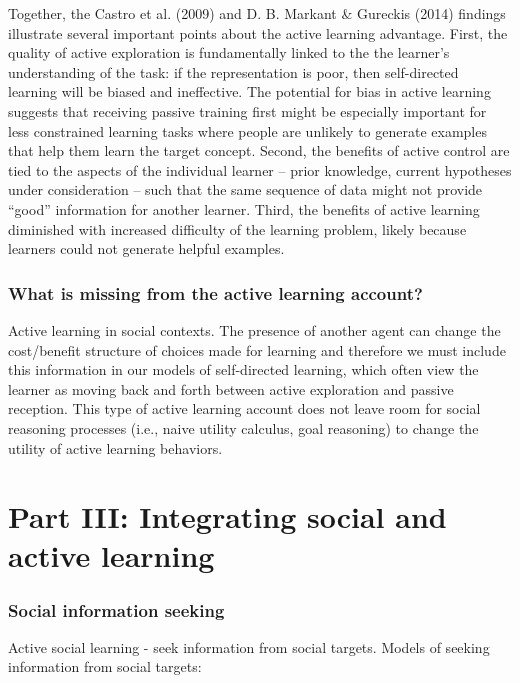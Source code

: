 \documentclass[a4paper,man,apacite,floatsintext]{apa6}
\begin{document}
Together, the Castro et al. (2009) and D. B. Markant \& Gureckis (2014)
findings illustrate several important points about the active learning
advantage. First, the quality of active exploration is fundamentally
linked to the the learner's understanding of the task: if the
representation is poor, then self-directed learning will be biased and
ineffective. The potential for bias in active learning suggests that
receiving passive training first might be especially important for less
constrained learning tasks where people are unlikely to generate
examples that help them learn the target concept. Second, the benefits
of active control are tied to the aspects of the individual learner --
prior knowledge, current hypotheses under consideration -- such that the
same sequence of data might not provide ``good'' information for another
learner. Third, the benefits of active learning diminished with
increased difficulty of the learning problem, likely because learners
could not generate helpful examples.

\subsubsection{What is missing from the active learning
account?}\label{what-is-missing-from-the-active-learning-account}

Active learning in social contexts. The presence of another agent can
change the cost/benefit structure of choices made for learning and
therefore we must include this information in our models of
self-directed learning, which often view the learner as moving back and
forth between active exploration and passive reception. This type of
active learning account does not leave room for social reasoning
processes (i.e., naive utility calculus, goal reasoning) to change the
utility of active learning behaviors.

\section{Part III: Integrating social and active
learning}\label{part-iii-integrating-social-and-active-learning}

\subsubsection{Social information
seeking}\label{social-information-seeking}

Active social learning - seek information from social targets. Models of
seeking information from social targets:
\end{document}
